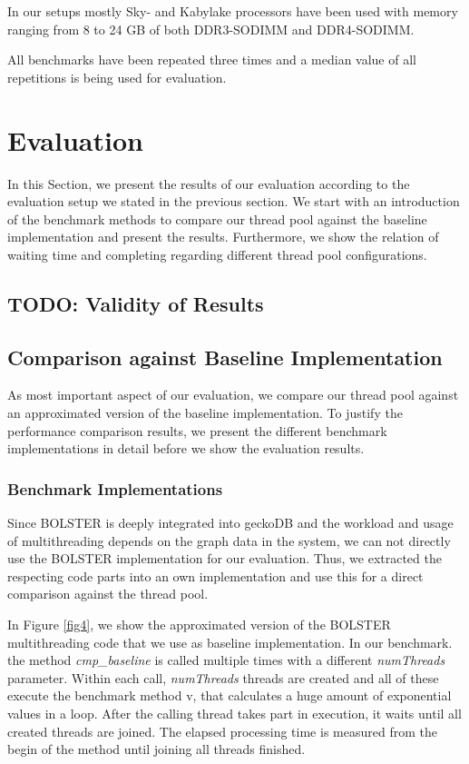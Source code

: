 \documentclass[conference]{IEEEtran}
\begin{document}
In our setups mostly Sky- and Kabylake processors have been used with memory
ranging from 8 to 24 GB of both DDR3-SODIMM and DDR4-SODIMM.

All benchmarks have been repeated three times and a median value of all
repetitions is being used for evaluation.

\section{Evaluation}
In this Section, we present the results of our evaluation according to the evaluation setup we stated in the previous section. We start with an introduction of the benchmark methods to compare our thread pool against the baseline implementation and present the results. Furthermore, we show the relation of waiting time and completing regarding different thread pool configurations.

\subsection{TODO: Validity of Results}

\subsection{Comparison against Baseline Implementation}
As most important aspect of our evaluation, we compare our thread pool against an approximated version of the baseline implementation. To justify the performance comparison results, we present the different benchmark implementations in detail before we show the evaluation results.

\subsubsection{Benchmark Implementations}
Since BOLSTER is deeply integrated into geckoDB and the workload and usage of multithreading depends on the graph data in the system, we can not directly use the BOLSTER implementation for our evaluation. Thus, we extracted the respecting code parts into an own implementation and use this for a direct comparison against the thread pool. 

In Figure \ref{fig4}, we show the approximated version of the BOLSTER multithreading code that we use as baseline implementation. In our benchmark. the method \emph{cmp\_baseline} is called multiple times with a different \emph{numThreads} parameter. Within each call, \emph{numThreads} threads are created and all of these execute the benchmark method v, that calculates a huge amount of exponential values in a loop. After the calling thread takes part in execution, it waits until all created threads are joined. The elapsed processing time is measured from the begin of the method until joining all threads finished.
\end{document}
